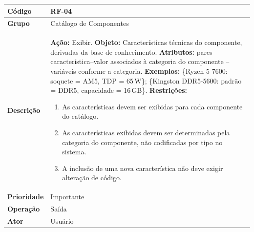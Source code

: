 \FloatBarrier
\begin{quadro}[htb]
  \caption{RF-04 -- Exibir características técnicas dos componentes}
  \label{quad:rf04}
  \begin{tabular}{|p{3.2cm}|p{11.8cm}|}
    \hline
    \textbf{Código}     & RF-04                                                                                                  \\ \hline
    \textbf{Grupo}      & Catálogo de Componentes                                                                                \\ \hline
    \textbf{Descrição}  &
    \textbf{Ação:} Exibir.
    \textbf{Objeto:} Características técnicas do componente, derivadas da base de conhecimento.
    \textbf{Atributos:} pares característica--valor associados à categoria do componente -- variáveis conforme a categoria.
    \textbf{Exemplos:} \{Ryzen 5 7600: soquete = AM5, TDP = 65\,W\}; \{Kingston DDR5-5600: padrão = DDR5, capacidade = 16\,GB\}.
    \textbf{Restrições:}
    \begin{enumerate}[nosep,leftmargin=1.2em,topsep=2pt,partopsep=0pt,parsep=0pt,itemsep=1pt]
      \item As características devem ser exibidas para cada componente do catálogo.
      \item As características exibidas devem ser determinadas pela categoria do componente, não codificadas por tipo no sistema.
      \item A inclusão de uma nova característica não deve exigir alteração de código.
    \end{enumerate} \\ \hline
    \textbf{Prioridade} & Importante                                                                                             \\ \hline
    \textbf{Operação}   & Saída                                                                                                  \\ \hline
    \textbf{Ator}       & Usuário                                                                                                \\ \hline
  \end{tabular}
\end{quadro}

